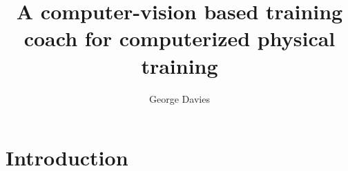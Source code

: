 \documentclass[runningheads]{llncs}
\begin{document}
%
\title{A computer-vision based training coach for computerized physical training}
%
%
\author{George Davies}
%
%
%
\maketitle              %
%



\section{Introduction}
\end{document}
